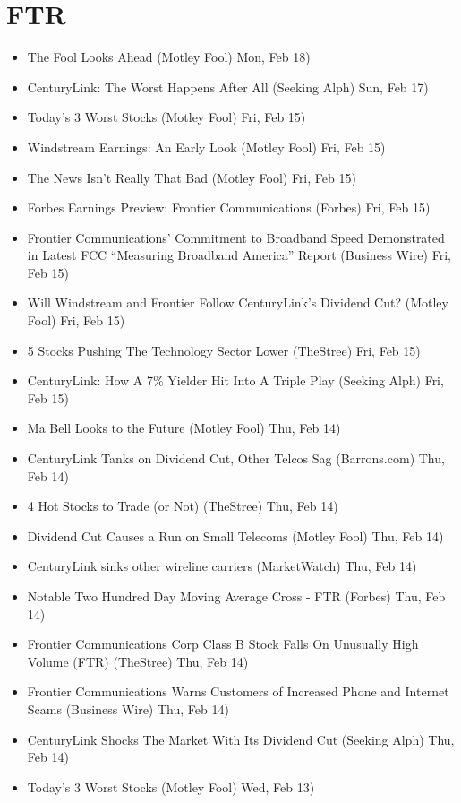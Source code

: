 \documentclass[11pt,asymmetric]{article}
\begin{document}
\section*{FTR}
\begin{itemize}
\item The Fool Looks Ahead (Motley Fool) Mon, Feb 18)
\item CenturyLink: The Worst Happens After All (Seeking Alph) Sun, Feb 17)
\item Today's 3 Worst Stocks (Motley Fool) Fri, Feb 15)
\item Windstream Earnings: An Early Look (Motley Fool) Fri, Feb 15)
\item The News Isn't Really That Bad (Motley Fool) Fri, Feb 15)
\item Forbes Earnings Preview: Frontier Communications (Forbes) Fri, Feb 15)
\item Frontier Communications’ Commitment to Broadband Speed Demonstrated in Latest FCC “Measuring Broadband America” Report (Business Wire) Fri, Feb 15)
\item Will Windstream and Frontier Follow CenturyLink's Dividend Cut? (Motley Fool) Fri, Feb 15)
\item 5 Stocks Pushing The Technology Sector Lower (TheStree) Fri, Feb 15)
\item CenturyLink: How A 7\% Yielder Hit Into A Triple Play (Seeking Alph) Fri, Feb 15)
\item Ma Bell Looks to the Future (Motley Fool) Thu, Feb 14)
\item CenturyLink Tanks on Dividend Cut, Other Telcos Sag (Barrons.com) Thu, Feb 14)
\item 4 Hot Stocks to Trade (or Not) (TheStree) Thu, Feb 14)
\item Dividend Cut Causes a Run on Small Telecoms (Motley Fool) Thu, Feb 14)
\item CenturyLink sinks other wireline carriers (MarketWatch) Thu, Feb 14)
\item Notable Two Hundred Day Moving Average Cross - FTR (Forbes) Thu, Feb 14)
\item Frontier Communications Corp Class B Stock Falls On Unusually High Volume (FTR) (TheStree) Thu, Feb 14)
\item Frontier Communications Warns Customers of Increased Phone and Internet Scams (Business Wire) Thu, Feb 14)
\item CenturyLink Shocks The Market With Its Dividend Cut (Seeking Alph) Thu, Feb 14)
\item Today's 3 Worst Stocks (Motley Fool) Wed, Feb 13)

\end{itemize}
\end{document}
